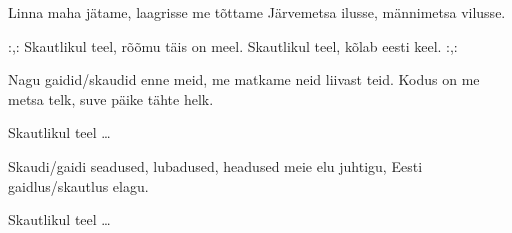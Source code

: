 Linna maha j\"atame,
laagrisse me t\~ottame
J\"arvemetsa ilusse,
m\"annimetsa vilusse.

:,: Skautlikul teel, r\~o\~omu t\"ais on meel.
Skautlikul teel, k\~olab eesti keel. :,:

Nagu gaidid/skaudid enne meid,
me matkame neid liivast teid.
Kodus on me metsa telk,
suve p\"aike t\"ahte helk.

Skautlikul teel \ldots

Skaudi/gaidi seadused, lubadused, headused
meie elu juhtigu, Eesti gaidlus/skautlus elagu.

Skautlikul teel \ldots